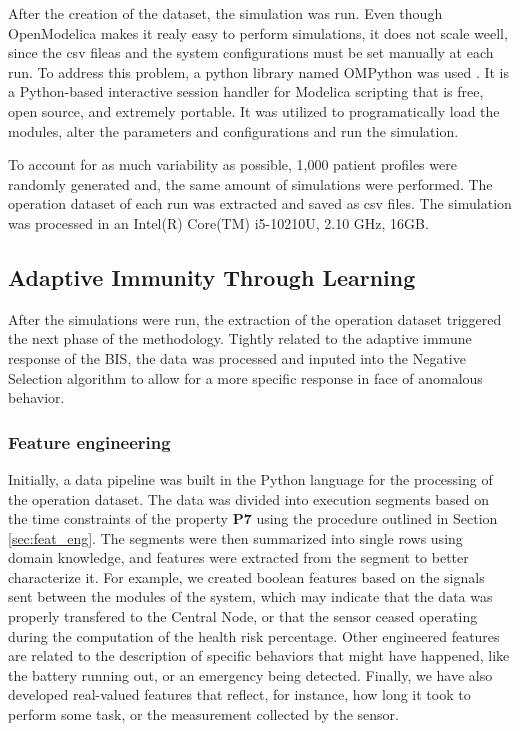 After the creation of the dataset, the simulation was run. Even though OpenModelica makes it realy easy to perform simulations, it does not scale weell, since the csv fileas and the system configurations must be set manually at each run. To address this problem, a python library named OMPython was used \cite{OMPython}. It is a Python-based interactive session handler for Modelica scripting that is free, open source, and extremely portable. It was utilized to programatically load the modules, alter the parameters and configurations and run the simulation.

To account for as much variability as possible, 1,000 patient profiles were randomly generated and, the same amount of simulations were performed. The operation dataset of each run was extracted and saved as csv files. The simulation was processed in an Intel(R) Core(TM) i5-10210U, 2.10 GHz, 16GB.

\subsection{Adaptive Immunity Through Learning}

After the simulations were run, the extraction of the operation dataset triggered the next phase of the methodology. Tightly related to the adaptive immune response of the BIS, the data was processed and inputed into the Negative Selection algorithm to allow for a more specific response in face of anomalous behavior.

\subsubsection{Feature engineering}

Initially, a data pipeline was built in the Python language for the processing of the operation dataset. The data was divided into execution segments based on the time constraints of the property \textbf{P7} using the procedure outlined in Section \ref{sec:feat_eng}. The segments were then summarized into single rows using domain knowledge, and features were extracted from the segment to better characterize it. For example, we created boolean features based on the signals sent between the modules of the system, which may indicate that the data was properly transfered to the Central Node, or that the sensor ceased operating during the computation of the health risk percentage. Other engineered features are related to the description of specific behaviors that might have happened, like the battery running out, or an emergency being detected. Finally, we have also developed real-valued features that reflect, for instance, how long it took to perform some task, or the measurement collected by the sensor.

